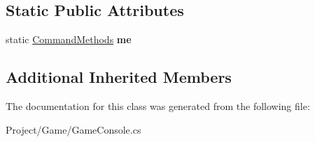 \subsection*{Static Public Attributes}
\begin{DoxyCompactItemize}
\item 
\mbox{\label{class_command_methods_a6c177cd600ed1dbde834c472effbfe66}} 
static \hyperlink{class_command_methods}{Command\+Methods} {\bfseries me}
\end{DoxyCompactItemize}
\subsection*{Additional Inherited Members}


The documentation for this class was generated from the following file\+:\begin{DoxyCompactItemize}
\item 
Project/\+Game/Game\+Console.\+cs\end{DoxyCompactItemize}
